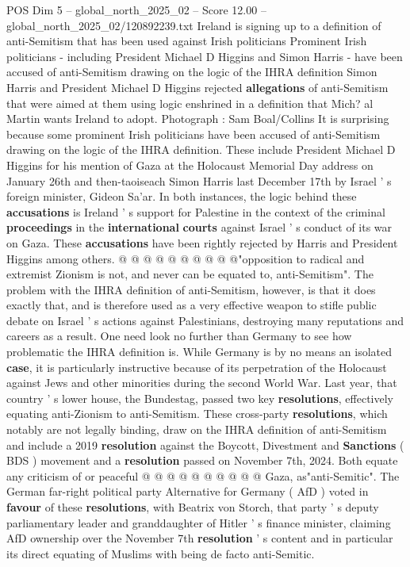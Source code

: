 \begin{textsample}{POS Dim 5 – global\_north\_2025\_02 – Score 12.00 – global\_north\_2025\_02/120892239.txt}  \label{ex:f5_pos_340}
Ireland is signing up to a definition of anti-Semitism that has been used against Irish politicians Prominent Irish politicians - including President Michael D Higgins and Simon Harris - have been accused of anti-Semitism drawing on the logic of the IHRA definition Simon Harris and President Michael D Higgins rejected \textbf{allegations} of anti-Semitism that were aimed at them using logic enshrined in a definition that Mich? al Martin wants Ireland to adopt.
Photograph : Sam Boal/Collins It is surprising because some prominent Irish politicians have been accused of anti-Semitism drawing on the logic of the IHRA definition.
These include President Michael D Higgins for his mention of Gaza at the Holocaust Memorial Day address on January 26th and then-taoiseach Simon Harris last December 17th by Israel ' s foreign minister, Gideon Sa'ar.
In both instances, the logic behind these \textbf{accusations} is Ireland ' s support for Palestine in the context of the criminal \textbf{proceedings} in the \textbf{international} \textbf{courts} against Israel ' s conduct of its war on Gaza.
These \textbf{accusations} have been rightly rejected by Harris and President Higgins among others. @ @ @ @ @ @ @ @ @ @"opposition to radical and extremist Zionism is not, and never can be equated to, anti-Semitism".
The problem with the IHRA definition of anti-Semitism, however, is that it does exactly that, and is therefore used as a very effective weapon to stifle public debate on Israel ' s actions against Palestinians, destroying many reputations and careers as a result.
One need look no further than Germany to see how problematic the IHRA definition is.
While Germany is by no means an isolated \textbf{case}, it is particularly instructive because of its perpetration of the Holocaust against Jews and other minorities during the second World War.
Last year, that country ' s lower house, the Bundestag, passed two key \textbf{resolutions}, effectively equating anti-Zionism to anti-Semitism.
These cross-party \textbf{resolutions}, which notably are not legally binding, draw on the IHRA definition of anti-Semitism and include a 2019 \textbf{resolution} against the Boycott, Divestment and \textbf{Sanctions} ( BDS ) movement and a \textbf{resolution} passed on November 7th, 2024.
Both equate any criticism of or peaceful @ @ @ @ @ @ @ @ @ @ Gaza, as"anti-Semitic".
The German far-right political party Alternative for Germany ( AfD ) voted in \textbf{favour} of these \textbf{resolutions}, with Beatrix von Storch, that party ' s deputy parliamentary leader and granddaughter of Hitler ' s finance minister, claiming AfD ownership over the November 7th \textbf{resolution} ' s content and in particular its direct equating of Muslims with being de facto anti-Semitic.

\end{textsample}
